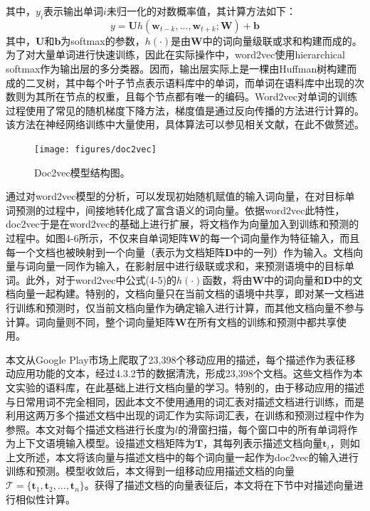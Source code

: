 其中，$y_i$表示输出单词$i$未归一化的对数概率值，其计算方法如下：
\begin{equation}
y = \mathbf{U}h(\mathbf{w}_{t-k}, ..., \mathbf{w}_{t+k}; \mathbf{W}) + \mathbf{b}
\end{equation}
其中，$\mathbf{U}$和$\mathbf{b}$为softmax的参数，$h(\cdot)$是由$\mathbf{W}$中的词向量级联或求和构建而成的。为了对大量单词进行快速训练，因此在实际操作中，word2vec使用hierarchical softmax\cite{morin2005hierarchical}作为输出层的多分类器。因而，输出层实际上是一棵由Huffman树\cite{huffman1952method}构建而成的二叉树，其中每个叶子节点表示语料库中的单词，而单词在语料库中出现的次数则为其所在节点的权重，且每个节点都有唯一的编码。Word2vec对单词的训练过程使用了常见的随机梯度下降方法，梯度值是通过反向传播的方法\cite{rumerhart1986learning}进行计算的。该方法在神经网络训练中大量使用，具体算法可以参见相关文献，在此不做赘述。

\begin{figure}
	\centering
	\texttt{[image: figures/doc2vec]}
	\caption{Doc2vec模型结构图。}
\end{figure}

通过对word2vec模型的分析，可以发现初始随机赋值的输入词向量，在对目标单词预测的过程中，间接地转化成了富含语义的词向量。依据word2vec此特性，doc2vec于是在word2vec的基础上进行扩展，将文档作为向量加入到训练和预测的过程中。如图4-6所示，不仅来自单词矩阵$\mathbf{W}$的每一个词向量作为特征输入，而且每一个文档也被映射到一个向量（表示为文档矩阵$\mathbf{D}$中的一列）作为输入。文档向量与词向量一同作为输入，在影射层中进行级联或求和，来预测语境中的目标单词。此外，对于word2vec中公式(4-5)的$h(\cdot)$函数，将由$\mathbf{W}$中的词向量和$\mathbf{D}$中的文档向量一起构建。特别的，文档向量只在当前文档的语境中共享，即对某一文档进行训练和预测时，仅当前文档向量作为确定输入进行计算，而其他文档向量不参与计算。词向量则不同，整个词向量矩阵$\mathbf{W}$在所有文档的训练和预测中都共享使用。

本文从Google Play市场上爬取了23,398个移动应用的描述，每个描述作为表征移动应用功能的文本，经过4.3.2节的数据清洗，形成23,398个文档。这些文档作为本文实验的语料库，在此基础上进行文档向量的学习。特别的，由于移动应用的描述与日常用词不完全相同，因此本文不使用通用的词汇表对描述文档进行训练，而是利用这两万多个描述文档中出现的词汇作为实际词汇表，在训练和预测过程中作为参照。本文对每个描述文档进行长度为$l$的滑窗扫描，每个窗口中的所有单词将作为上下文语境输入模型。设描述文档矩阵为$\mathbf{T}$，其每列表示描述文档向量$\mathbf{t}_i$，则如上文所述，本文将该向量与描述文档中的每个词向量一起作为doc2vec的输入进行训练和预测。模型收敛后，本文得到一组移动应用描述文档的向量$\mathcal{T} = \{\mathbf{t}_1, \mathbf{t}_2, ..., \mathbf{t}_n\}$。获得了描述文档的向量表征后，本文将在下节中对描述向量进行相似性计算。


